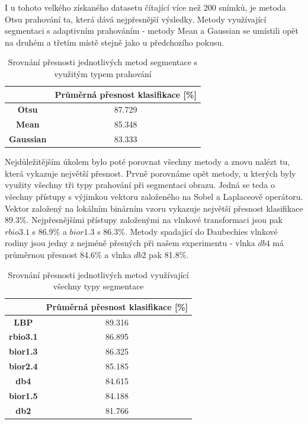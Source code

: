 I u tohoto velkého získaného datasetu čítající více než 200 snímků, je metoda Otsu prahování ta, která dává nejpřesnější výsledky. Metody využívající segmentaci s adaptivním prahováním - metody Mean a Gaussian se umístili opět na druhém a třetím místě stejně jako u předchozího pokusu.

\capstartfalse
\begin{table}[!htbp]
\centering
\begin{tabular}{|c|c|}
\hline
                  & \textbf{Průměrná přesnost klasifikace {[}\%{]}} \\ \hline
\textbf{Otsu}     & 87.729                                         \\ \hline
\textbf{Mean}     & 85.348                                         \\ \hline
\textbf{Gaussian} & 83.333                                         \\ \hline
\end{tabular}
\caption{Srovnání přesnosti jednotlivých metod segmentace s využitým typem prahování}
\end{table}
\capstarttrue

Nejdůležitějším úkolem bylo poté porovnat všechny metody a znovu nalézt tu, která vykazuje největší přesnost. Prvně porovnáme opět metody, u kterých byly využity všechny tři typy prahování při segmentaci obrazu. Jedná se teda o všechny přístupy s výjimkou vektoru založeného na Sobel a Laplaceově operátoru. Vektor založený na lokálním binárním vzoru vykazuje největší přesnost klasifikace 89.3\%. Nejpřesnějšími přístupy založenými na vlnkové transformaci jsou pak $rbio3.1$ s 86.9\% a $bior1.3$ s 86.3\%. Metody spadající do Daubechies vlnkové rodiny jsou jedny z nejméně přesných při našem experimentu - vlnka $db4$ má průměrnou přesnost 84.6\% a vlnka $db2$ pak 81.8\%.

\capstartfalse
\begin{table}[!htbp]
\centering
\begin{tabular}{|c|c|}
\hline
                 & \textbf{Průměrná přesnost klasifikace {[}\%{]}} \\ \hline
\textbf{LBP}     & 89.316                                         \\ \hline
\textbf{rbio3.1} & 86.895                                         \\ \hline
\textbf{bior1.3} & 86.325                                         \\ \hline
\textbf{bior2.4} & 85.185                                         \\ \hline
\textbf{db4}     & 84.615                                         \\ \hline
\textbf{bior1.5} & 84.188                                         \\ \hline
\textbf{db2}     & 81.766                                         \\ \hline
\end{tabular}
\caption{Srovnání přesnosti jednotlivých metod využívající všechny typy segmentace}
\end{table}
\capstarttrue

